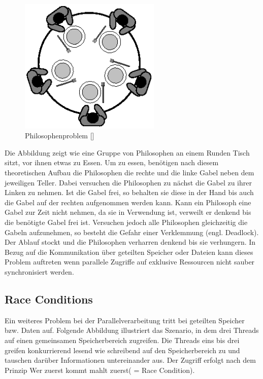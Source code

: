 \documentclass[12pt,oneside,a4paper,bibtotoc,liststotoc]{scrreprt}
\begin{document}
\begin{figure}[H]
  \begin{centering}
    \includegraphics[width=0.6\textwidth]{img/PhilosophenProblem.png}
    \caption{Philosophenproblem [\citet{philosofen}]}
    \label{Philosophenproblem}
  \end{centering}
\end{figure}
Die Abbildung zeigt wie eine Gruppe von Philosophen an einem Runden Tisch sitzt, vor ihnen etwas zu Essen. Um zu essen, benötigen nach diesem theoretischen Aufbau die Philosophen die rechte und die linke Gabel neben dem jeweiligen Teller. Dabei versuchen die Philosophen zu nächst die Gabel zu ihrer Linken zu nehmen. Ist die Gabel frei, so behalten sie diese in der Hand bis auch die Gabel auf der rechten aufgenommen werden kann. Kann ein Philosoph eine Gabel zur Zeit nicht nehmen, da sie in Verwendung ist, verweilt er denkend bis die benötigte Gabel frei ist. Versuchen jedoch alle Philosophen gleichzeitig die Gabeln aufzunehmen, so besteht die Gefahr einer Verklemmung (engl. Deadlock). Der Ablauf stockt und die Philosophen verharren denkend bis sie verhungern. In Bezug auf die Kommunikation über geteilten Speicher oder Dateien kann dieses Problem auftreten wenn parallele Zugriffe auf exklusive Ressourcen nicht sauber synchronisiert werden.



\subsection{Race Conditions}
Ein weiteres Problem bei der Parallelverarbeitung tritt bei geteilten Speicher bzw. Daten auf. Folgende Abbildung illustriert das Szenario, in dem drei Threads auf einen gemeinsamen Speicherbereich zugreifen. Die Threads eins bis drei greifen konkurrierend lesend wie schreibend auf den Speicherbereich zu und tauschen darüber Informationen untereinander aus. Der Zugriff erfolgt nach dem Prinzip \glqq Wer zuerst kommt mahlt zuerst\grqq  ( = Race Condition).
\end{document}
